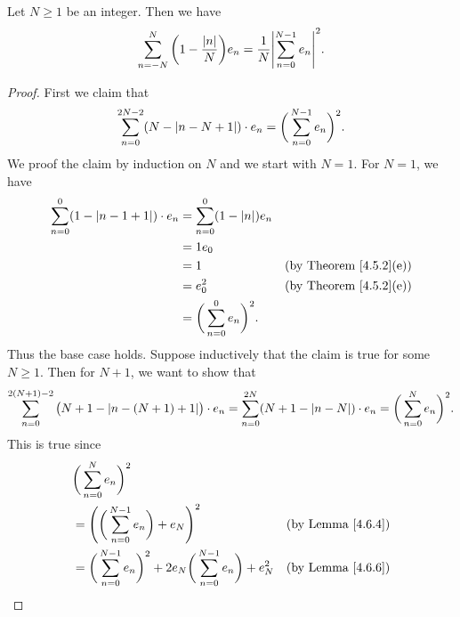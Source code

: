 \begin{additional corollary}\label{ac 5.4.2}
Let \(N \geq 1\) be an integer.
Then we have
\[
    \sum_{n = -N}^N \bigg(1 - \frac{\abs{n}}{N}\bigg) e_n = \frac{1}{N} \abs{\sum_{n = 0}^{N - 1} e_n}^2.
\]
\end{additional corollary}

\begin{proof}
    First we claim that
    \[
        \sum_{n = 0}^{2N - 2} (N - \left\lvert n - N + 1\right\rvert) \cdot e_n = \bigg(\sum_{n = 0}^{N - 1} e_n\bigg)^2.
    \]
    We proof the claim by induction on \(N\) and we start with \(N = 1\).
    For \(N = 1\), we have
    \begin{align*}
        \sum_{n = 0}^0 (1 - \left\lvert n - 1 + 1\right\rvert) \cdot e_n & = \sum_{n = 0}^0 (1 - \left\lvert n\right\rvert) e_n                                       \\
                                                       & = 1 e_0                                                                  \\
                                                       & = 1                                 & \text{(by Theorem \ref{4.5.2}(e))} \\
                                                       & = e_0^2                             & \text{(by Theorem \ref{4.5.2}(e))} \\
                                                       & = \bigg(\sum_{n = 0}^0 e_n\bigg)^2.
    \end{align*}
    Thus the base case holds.
    Suppose inductively that the claim is true for some \(N \geq 1\).
    Then for \(N + 1\), we want to show that
    \[
        \sum_{n = 0}^{2(N + 1) - 2} \big(N + 1 - \abs{n - (N + 1) + 1}\big) \cdot e_n = \sum_{n = 0}^{2N} (N + 1 - \abs{n - N}) \cdot e_n = \bigg(\sum_{n = 0}^N e_n\bigg)^2.
    \]
    This is true since
    \begin{align*}
         & \bigg(\sum_{n = 0}^N e_n\bigg)^2                                                                                                                                  \\
         & = \Bigg(\bigg(\sum_{n = 0}^{N - 1} e_n\bigg) + e_N\Bigg)^2                                                                     & \text{(by Lemma \ref{4.6.4})}    \\
         & = \bigg(\sum_{n = 0}^{N - 1} e_n\bigg)^2 + 2 e_N \bigg(\sum_{n = 0}^{N - 1} e_n\bigg) + e_N^2                                  & \text{(by Lemma \ref{4.6.6})}    \\

\end{align*}
\end{proof}
